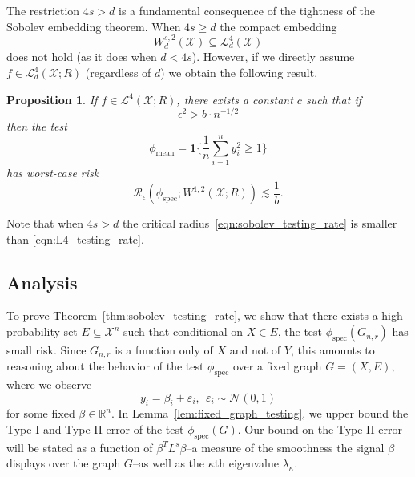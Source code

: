 \documentclass{article}
\newcommand{\Reals}{\mathbb{R}}
\newcommand{\1}{\mathbf{1}}
\newcommand{\Xset}{\mathcal{X}}
\newcommand{\Leb}{\mathcal{L}}
\newcommand{\spec}{\mathrm{spec}}
\theoremstyle{alden}
\theoremstyle{aldenthm}
\newtheorem{proposition}{Proposition}
\theoremstyle{definition}
\theoremstyle{remark}
\begin{document}
The restriction $4s > d$ is a fundamental consequence of the tightness of the Sobolev embedding theorem. When $4s \geq d$ the compact embedding
\begin{equation*}
W_d^{s,2}(\mathcal{X}) \subseteq \mathcal{L}_d^4(\mathcal{X}) 
\end{equation*}
does not hold (as it does when $d < 4s$). However, if we directly assume $f \in \mathcal{L}_d^4(\mathcal{X};R)$ (regardless of $d$) we obtain the following result.
\begin{proposition}
	\label{prop:L4_testing_rate}
	If $f \in \Leb^4(\mathcal{X};R)$, there exists a constant $c$ such that if
	\begin{equation}
	\label{eqn:L4_testing_rate}
	\epsilon^2 > b \cdot n^{-1/2}
	\end{equation}
	then the test
	\begin{equation*}
	\phi_{\mathrm{mean}} = \1\{\frac{1}{n}\sum_{i = 1}^{n} y_i^2 \geq 1\}
	\end{equation*}
	has worst-case risk
	\begin{equation*}
	\mathcal{R}_{\epsilon}(\phi_{\mathrm{spec}}; W^{1,2}(\mathcal{X};R)) \lesssim \frac{1}{b}. 
	\end{equation*}
\end{proposition}
Note that when $4s > d$ the critical radius~\eqref{eqn:sobolev_testing_rate} is smaller than \eqref{eqn:L4_testing_rate}. 

\subsection{Analysis}

To prove Theorem~\ref{thm:sobolev_testing_rate}, we show that there exists a high-probability set $E \subseteq \Xset^n$ such that conditional on $X \in E$, the test $\phi_{\spec}(G_{n,r})$ has small risk. Since $G_{n,r}$ is a function only of $X$ and not of $Y$, this amounts to reasoning about the behavior of the test $\phi_{\spec}$ over a fixed graph $G = (X,E)$, where we observe
\begin{equation}
y_i = \beta_i + \varepsilon_i,~~\varepsilon_i \sim \mathcal{N}(0,1)
\end{equation}
for some fixed $\beta \in \Reals^n$.  In Lemma~\ref{lem:fixed_graph_testing}, we upper bound the Type I and Type II error of the test $\phi_{\spec}(G)$. Our bound on the Type II error will be stated as a function of $\beta^T L^s \beta$--a measure of the smoothness the signal $\beta$ displays over the graph $G$--as well as the $\kappa$th eigenvalue $\lambda_{\kappa}$.
\end{document}
